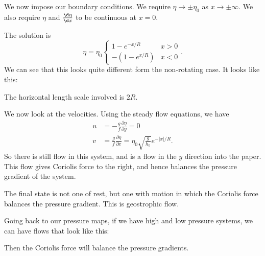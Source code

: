 \documentclass[a4paper]{article}
\begin{document}
\begin{eg}
  We now impose our boundary conditions. We require $\eta \to \pm \eta_0$ as $x \to \pm \infty$. We also require $\eta$ and $\frac{\d \eta}{\d x}$ to be continuous at $x = 0$.

  The solution is
  \[
    \eta = \eta_0
    \begin{cases}
      1 - e^{-x/R} & x > 0\\
      -(1 - e^{x/R}) & x < 0
    \end{cases}.
  \]
  We can see that this looks quite different form the non-rotating case. It looks like this:
  \begin{center}
  \end{center}
  The horizontal length scale involved is $2R$.

  We now look at the velocities. Using the steady flow equations, we have
  \begin{align*}
    u &= -\frac{g}{f} \frac{\partial \eta}{\partial y} = 0\\
    v &= \frac{g}{f} \frac{\partial\eta}{\partial x} = \eta_0 \sqrt{\frac{g}{h_0}} e^{-|x|/R}.
  \end{align*}
  So there is still flow in this system, and is a flow in the $y$ direction into the paper. This flow gives Coriolis force to the right, and hence balances the pressure gradient of the system.

  The final state is not one of rest, but one with motion in which the Coriolis force balances the pressure gradient. This is geostrophic flow.
\end{eg}

Going back to our pressure maps, if we have high and low pressure systems, we can have flows that look like this:
\begin{center}
\end{center}
Then the Coriolis force will balance the pressure gradients.
\end{document}
